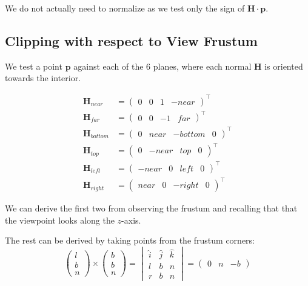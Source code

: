 \documentclass[11pt]{article}
\begin{document}
We do not actually need to normalize as we test only the sign of $\bm{H} \cdot \bm{p}$.

\subsection{Clipping with respect to View Frustum}
We test a point $\bm{p}$ against each of the 6 planes, where each normal $\bm{H}$ is oriented towards the interior.

\begin{align*}
  \bm{H}_{near} &= \begin{pmatrix} 0 & 0 & 1 & -near \end{pmatrix}^\intercal \\
  \bm{H}_{far} &= \begin{pmatrix} 0 & 0 & -1 & far \end{pmatrix}^\intercal \\
  \bm{H}_{bottom} &= \begin{pmatrix} 0 &  near & -bottom & 0 \end{pmatrix}^\intercal \\
  \bm{H}_{top} &= \begin{pmatrix} 0 & -near & top & 0 \end{pmatrix}^\intercal \\
  \bm{H}_{left} &= \begin{pmatrix} -near  & 0 & left & 0 \end{pmatrix}^\intercal \\
  \bm{H}_{right} &= \begin{pmatrix} near & 0 & -right & 0 \end{pmatrix}^\intercal
\end{align*}

We can derive the first two from observing the frustum and recalling that that the viewpoint looks along the $z$-axis.

The rest can be derived by taking points from the frustum corners:
\[
  \begin{pmatrix} l \\ b \\ n \end{pmatrix}
  \times
  \begin{pmatrix} b \\ b \\ n \end{pmatrix}
  =
  \begin{vmatrix}
    \hat{i} & \hat{j} & \hat{k} \\
    l & b & n \\
    r & b & n
  \end{vmatrix}
  =
  \begin{pmatrix} 0 & n & -b \end{pmatrix}
\]
\end{document}
